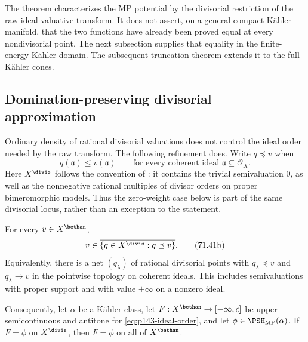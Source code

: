 \begin{remark}\label{rem:pseff-finite-energy-raw-function}
The theorem characterizes the MP potential by the divisorial restriction
of the raw ideal-valuative transform.  It does not assert, on a general
compact K\"ahler manifold, that the two functions have already been proved
equal at every nondivisorial point.  The next subsection supplies that
equality in the finite-energy K\"ahler domain. The subsequent truncation
theorem extends it to the full K\"ahler cones.
\end{remark}

\subsection{Domination-preserving divisorial approximation}
\label{sec:pseff-dominated-density}

Ordinary density of rational divisorial valuations does not control the
ideal order needed by the raw transform.  The following refinement does.
Write $q\preceq v$ when
\[
 q(\mathfrak a)\leq v(\mathfrak a)
 \qquad\text{for every coherent ideal }\mathfrak a\subseteq\mathcal O_X.
\tag{71.41a}\label{eq:p143-ideal-order}
\]
Here $X^{\divis}$ follows the convention of
\cite[Definition~2.3.1]{MP24}: it contains the trivial semivaluation $0$,
as well as the nonnegative rational multiples of divisor orders on proper
bimeromorphic models.  Thus the zero-weight case below is part of the same
divisorial locus, rather than an exception to the statement.

\begin{theorem}\label{thm:p143-dominated-divisorial-density}
For every \(v\in X^{\bethan}\),
\[
 v\in\overline{\{q\in X^{\divis}:q\preceq v\}}.
\tag{71.41b}\label{eq:p143-dominated-divisorial-density}
\]
Equivalently, there is a net \((q_\lambda)\) of rational divisorial
points with \(q_\lambda\preceq v\) and \(q_\lambda\to v\) in the
pointwise topology on coherent ideals.  This includes semivaluations with
proper support and with value \(+\infty\) on a nonzero ideal.

Consequently, let \(\alpha\) be a K\"ahler class, let
\(F:X^{\bethan}\to[-\infty,c]\) be upper semicontinuous and antitone for
\eqref{eq:p143-ideal-order}, and let \(\phi\in\PSH_{\mathrm{MP}}(\alpha)\).
If \(F=\phi\) on \(X^{\divis}\), then \(F=\phi\) on all of
\(X^{\bethan}\).
\end{theorem}


